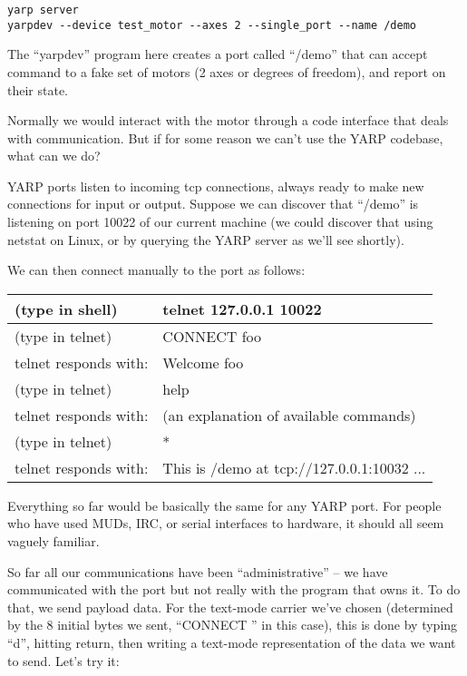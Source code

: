 \begin{verbatim}
yarp server
yarpdev --device test_motor --axes 2 --single_port --name /demo
\end{verbatim}

The ``yarpdev'' program here creates a port called ``/demo'' that can
accept command to a fake set of motors (2 axes or degrees of freedom),
and report on their state.

Normally we would interact with the motor through a code
interface that deals with communication.  But if for 
some reason we can't use the YARP codebase, what can
we do?

YARP ports listen to incoming tcp connections, always ready to make
new connections for input or output.  Suppose we can discover that
``/demo'' is listening on port 10022 of our current machine (we could
discover that using netstat on Linux, or by querying the YARP server
as we'll see shortly).

We can then connect manually to the port as follows:

\begin{tabular}{|l|l|}
\hline
(type in shell) & telnet 127.0.0.1 10022 \\
\hline
(type in telnet) & CONNECT foo \\
\hline
telnet responds with: & Welcome foo \\
\hline
(type in telnet) & help \\
\hline
telnet responds with: & (an explanation of available commands) \\
\hline
(type in telnet) & * \\
\hline
telnet responds with: & This is /demo at tcp://127.0.0.1:10032 ... \\
\hline
\end{tabular}

Everything so far would be basically the same for any YARP port.
For people who have used MUDs, IRC, or serial interfaces to hardware,
it should all seem vaguely familiar.

So far all our communications have been ``administrative'' --
we have communicated with the port but not really with the 
program that owns it.  To do that, we send payload data.  For the
text-mode carrier we've chosen (determined by the 8 initial
bytes we sent, ``CONNECT '' in this case), this is done by typing
``d'', hitting return, then writing a text-mode representation of
the data we want to send.  Let's try it:

